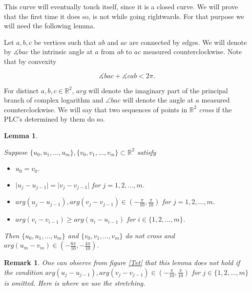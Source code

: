 \documentclass[openright, 12pt]{article}
\newtheorem{lema}[teorema]{Lemma}
\newtheorem{rem}[teorema]{Remark}
\newcommand{\field}[1]{\ensuremath{\mathbb{#1}}}
\newcommand{\R}{\field{R}}
\begin{document}
This curve will eventually touch itself, since it is a closed curve. We will prove that the first time it does so, is not while going rightwards. For that purpose we will need the following lemma.


Let $a, b, c$ be vertices such that $ab $ and $ac$ are connected by edges. We will denote by $\measuredangle bac $ the intrinsic angle at $a $ from $ab$ to $ac$ measured counterclockwise. Note that by convexity

\begin{equation}\label{Alex}
\measuredangle bac + \measuredangle  cab  < 2\pi.
\end{equation} 

For distinct $a,b,c \in \R^2$, $arg$ will denote the imaginary part of the principal branch of complex logarithm and $\angle bac $ will denote the angle at $a$ measured counterclockwise. We will say that two sequences of points in $\R ^2$ \textit{cross} if the PLC's determined by them do so. 


\begin{lema} \label{Ant}
{\rm Suppose $\{ u_0, u_1, \ldots , u_m     \}, \{ v_0, v_1, \ldots , v_m      \} \subset \R^2$ satisfy
\begin{itemize}
\item $u_0 = v_0$.
\item $\vert u_j - u_{j-1} \vert = \vert v_j - v_{j-1}  \vert$ for $j=1,2, \ldots, m$.
\item $arg(u_{j }- u_{j-1}), arg(v_j - v_{j-1} )  \in \left( -\frac{\pi}{10},\frac{\pi}{10} \right)$ for $j = 1, 2, \ldots , m$.
\item $arg (v_{i} - v_{i-1} )\geq arg (u_{i} - u_{i-1})$ for $i \in \{ 1, 2, \ldots, m \} $.
\end{itemize}

Then $\{ u_0, u_1, \ldots , u_m     \}$ and $ \{ v_0, v_1, \ldots , v_m      \}$ do not cross and  \\
$arg(u_m - v_m) \in \left( - \frac{6 \pi}{10} , -\frac{4\pi}{10}  \right)$.
}
\end{lema}



\begin{rem}
{\rm One can observe from figure \ref{Tet} that this lemma does not hold if the condition $arg(u_{j }- u_{j-1}), arg(v_j - v_{j-1} )  \in \left( -\frac{\pi}{10},\frac{\pi}{10} \right)$ for $j \in \{ 1, 2, \ldots , m\} $ is omitted. Here is where we use the stretching. 
}
\end{rem}
\end{document}
